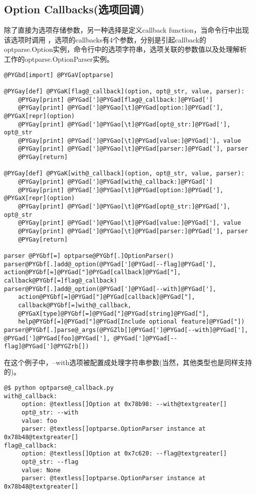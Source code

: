 \documentclass[letterpaper,10pt,english]{manual}
\begin{document}
\subsection{Option Callbacks(选项回调)}

除了直接为选项存储参数，另一种选择是定义callback function，当命令行中出现该选项时调用 ，选项的callbacks有4个参数，分别是引起callback的optparse.Option实例，命令行中的选项字符串，选项关联的参数值以及处理解析工作的optparse.OptionParser实例。

\begin{Verbatim}[commandchars=@\[\]]
@PYGbd[import] @PYGaV[optparse]

@PYGay[def] @PYGaK[flag@_callback](option, opt@_str, value, parser):
    @PYGay[print] @PYGad[']@PYGad[flag@_callback:]@PYGad[']
    @PYGay[print] @PYGad[']@PYGao[\t]@PYGad[option:]@PYGad['], @PYGaX[repr](option)
    @PYGay[print] @PYGad[']@PYGao[\t]@PYGad[opt@_str:]@PYGad['], opt@_str
    @PYGay[print] @PYGad[']@PYGao[\t]@PYGad[value:]@PYGad['], value
    @PYGay[print] @PYGad[']@PYGao[\t]@PYGad[parser:]@PYGad['], parser
    @PYGay[return]

@PYGay[def] @PYGaK[with@_callback](option, opt@_str, value, parser):
    @PYGay[print] @PYGad[']@PYGad[with@_callback:]@PYGad[']
    @PYGay[print] @PYGad[']@PYGao[\t]@PYGad[option:]@PYGad['], @PYGaX[repr](option)
    @PYGay[print] @PYGad[']@PYGao[\t]@PYGad[opt@_str:]@PYGad['], opt@_str
    @PYGay[print] @PYGad[']@PYGao[\t]@PYGad[value:]@PYGad['], value
    @PYGay[print] @PYGad[']@PYGao[\t]@PYGad[parser:]@PYGad['], parser
    @PYGay[return]

parser @PYGbf[=] optparse@PYGbf[.]OptionParser()
parser@PYGbf[.]add@_option(@PYGad[']@PYGad[--flag]@PYGad['], action@PYGbf[=]@PYGad["]@PYGad[callback]@PYGad["], callback@PYGbf[=]flag@_callback)
parser@PYGbf[.]add@_option(@PYGad[']@PYGad[--with]@PYGad['],
    action@PYGbf[=]@PYGad["]@PYGad[callback]@PYGad["],
    callback@PYGbf[=]with@_callback,
    @PYGaX[type]@PYGbf[=]@PYGad["]@PYGad[string]@PYGad["],
    help@PYGbf[=]@PYGad["]@PYGad[Include optional feature]@PYGad["])
parser@PYGbf[.]parse@_args(@PYGZlb[]@PYGad[']@PYGad[--with]@PYGad['], @PYGad[']@PYGad[foo]@PYGad['], @PYGad[']@PYGad[--flag]@PYGad[']@PYGZrb[])
\end{Verbatim}

在这个例子中，--with选项被配置成处理字符串参数(当然，其他类型也是同样支持的)。

\begin{Verbatim}[commandchars=@\[\]]
@$ python optparse@_callback.py
with@_callback:
     option: @textless[]Option at 0x78b98: --with@textgreater[]
     opt@_str: --with
     value: foo
     parser: @textless[]optparse.OptionParser instance at 0x78b48@textgreater[]
flag@_callback:
     option: @textless[]Option at 0x7c620: --flag@textgreater[]
     opt@_str: --flag
     value: None
     parser: @textless[]optparse.OptionParser instance at 0x78b48@textgreater[]
\end{Verbatim}
\end{document}
